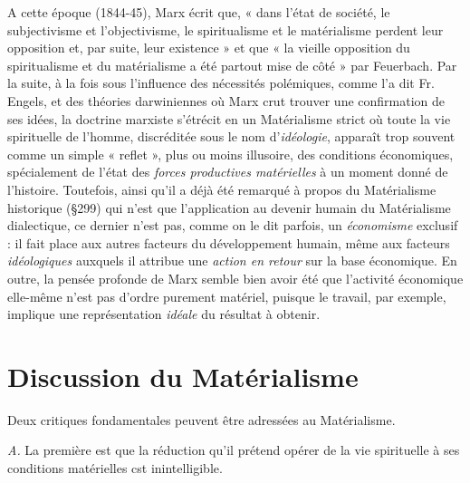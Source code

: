 A cette époque (1844-45), Marx écrit que, « dans l’état de société,
le subjectivisme et l’objectivisme, le spiritualisme et le matérialisme
perdent leur opposition et, par suite, leur existence » et que « la vieille
opposition du spiritualisme et du matérialisme a été partout mise
de côté » par Feuerbach. Par la suite, à la fois sous l'influence des
nécessités polémiques, comme l’a dit Fr. Engels, et des théories
darwiniennes où Marx crut trouver une confirmation de ses idées, la
doctrine marxiste s’étrécit en un Matérialisme strict où toute la vie
spirituelle de l’homme, discréditée sous le nom d’{\it idéologie}, apparaît
trop souvent comme un simple « reflet », plus ou moins illusoire, des
conditions économiques, spécialement de l’état des {\it forces productives
matérielles} à un moment donné de l’histoire. Toutefois, ainsi qu’il a
déjà été remarqué à propos du Matérialisme historique (\S 299) qui
n’est que l’application au devenir humain du Matérialisme dialectique,
ce dernier n’est pas, comme on le dit parfois, un {\it économisme} exclusif :
il fait place aux autres facteurs du développement humain, même
aux facteurs {\it idéologiques} auxquels il attribue une {\it action en retour}
sur la base économique. En outre, la pensée profonde de Marx semble
bien avoir été que l’activité économique elle-même n’est pas d’ordre
purement matériel, puisque le travail, par exemple, implique une
représentation {\it idéale} du résultat à obtenir.

\section{Discussion du Matérialisme}%
Deux critiques fondamentales
peuvent être adressées au Matérialisme.

{\it A.} La première
est que la réduction qu’il prétend opérer de la vie spirituelle à ses
conditions matérielles cst inintelligible.

